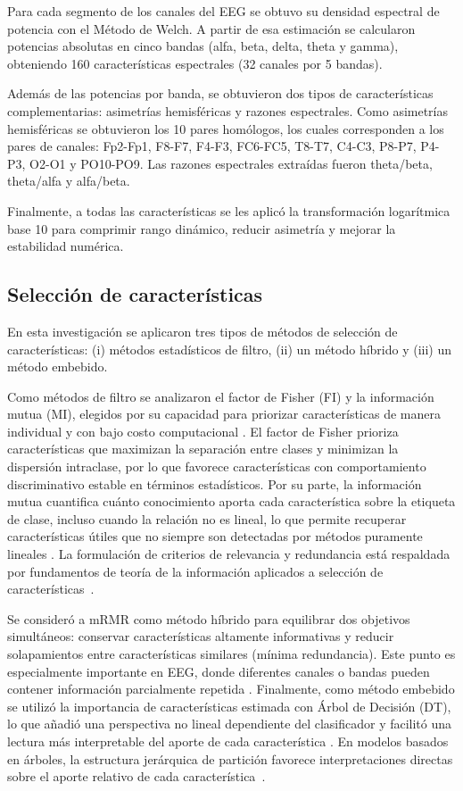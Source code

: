 \documentclass[runningheads]{llncs}
\begin{document}
Para cada segmento de los canales del EEG se obtuvo su densidad espectral de potencia con el Método de Welch. A partir de esa estimación se calcularon potencias absolutas en cinco bandas (alfa, beta, delta, theta y gamma), obteniendo 160 características espectrales (32 canales por 5 bandas).

Además de las potencias por banda, se obtuvieron dos tipos de características complementarias: asimetrías hemisféricas y razones espectrales. Como asimetrías hemisféricas se obtuvieron los 10 pares homólogos, los cuales corresponden a los pares de canales: Fp2-Fp1, F8-F7, F4-F3, FC6-FC5, T8-T7, C4-C3, P8-P7, P4-P3, O2-O1 y PO10-PO9. Las razones espectrales extraídas fueron theta/beta, theta/alfa y alfa/beta.

Finalmente, a todas las características se les aplicó la transformación logarítmica base 10 para comprimir rango dinámico, reducir asimetría y mejorar la estabilidad numérica.

\subsection{Selección de características}
En esta investigación se aplicaron tres tipos de métodos de selección de características: (i) métodos estadísticos de filtro, (ii) un método híbrido y (iii) un método embebido.

Como métodos de filtro se analizaron el factor de Fisher (FI) y la información mutua (MI), elegidos por su capacidad para priorizar características de manera individual y con bajo costo computacional \cite{Fisher1936}. El factor de Fisher prioriza características que maximizan la separación entre clases y minimizan la dispersión intraclase, por lo que favorece características con comportamiento discriminativo estable en términos estadísticos. Por su parte, la información mutua cuantifica cuánto conocimiento aporta cada característica sobre la etiqueta de clase, incluso cuando la relación no es lineal, lo que permite recuperar características útiles que no siempre son detectadas por métodos puramente lineales \cite{Shannon1948}. La formulación de criterios de relevancia y redundancia está respaldada por fundamentos de teoría de la información aplicados a selección de características~\cite{CoverThomas2006}.

Se consideró a mRMR como método híbrido para equilibrar dos objetivos simultáneos: conservar características altamente informativas y reducir solapamientos entre características similares (mínima redundancia). Este punto es especialmente importante en EEG, donde diferentes canales o bandas pueden contener información parcialmente repetida \cite{Peng2005}. Finalmente, como método embebido se utilizó la importancia de características estimada con Árbol de Decisión (DT), lo que añadió una perspectiva no lineal dependiente del clasificador y facilitó una lectura más interpretable del aporte de cada característica \cite{Breiman2001}. En modelos basados en árboles, la estructura jerárquica de partición favorece interpretaciones directas sobre el aporte relativo de cada característica~\cite{Breiman1984}.
\end{document}
